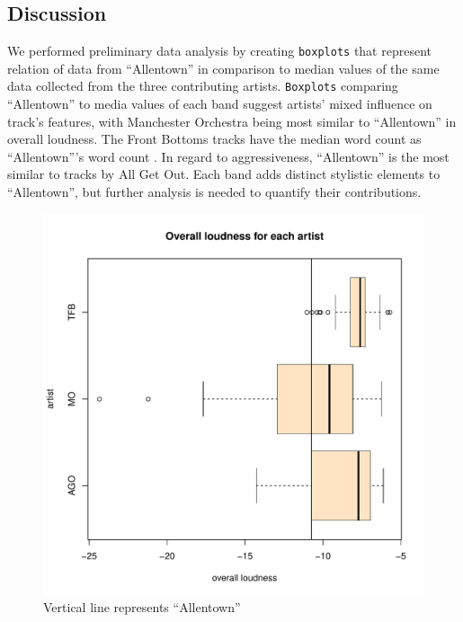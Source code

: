 \documentclass{article}\usepackage[]{graphicx}\usepackage[]{xcolor}
\makeatletter
\def\maxwidth{ %
  \ifdim\Gin@nat@width>\linewidth
    \linewidth
  \else
    \Gin@nat@width
  \fi
}
\newenvironment{knitrout}{}{} %
\makeatother
\begin{document}
\begin{multicols}{2}
\section{Discussion}
We performed preliminary data analysis by creating \texttt{boxplots} that represent relation of data from ``Allentown'' in comparison to median values of the same data collected from the three contributing artists. 
\texttt{Boxplots} comparing ``Allentown'' to media values of each band suggest artists' mixed influence on track's features, with Manchester Orchestra being most similar to ``Allentown'' in overall loudness. The Front Bottoms tracks have the median word count as ``Allentown'''s word count . In regard to aggressiveness, ``Allentown'' is the most similar to tracks by All Get Out. Each band adds distinct stylistic elements to ``Allentown'', but further analysis is needed to quantify their contributions.













\begin{figure}[H]
\begin{knitrout}\scriptsize
{}\color{fgcolor}
\includegraphics[width=\maxwidth]{figure/unnamed-chunk-3-1} 
\end{knitrout}
\caption{Vertical line represents ``Allentown''} \label{plot1}
\end{figure}


\end{multicols}
\end{document}
